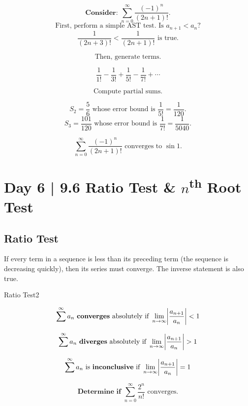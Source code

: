\documentclass[10pt]{article}
\theoremstyle{definition}
\DeclarePairedDelimiter{\abs}{\lvert}{\rvert}
\begin{document}
\vspace{0.5 cm}


\[ \textbf{Consider: } \sum_{n=0}^{\infty} \frac{(-1)^n}{(2n+1)!}.\] 
\[\text{First, perform a simple AST test. Is } a_{n+1}<a_n?\]
\[\frac{1}{(2n+3)!}<\frac{1}{(2n+1)!} \text{ is true.}\]

\[\text{Then, generate terms.}\]


\[\frac{1}{1!} - \frac{1}{3!} + \frac{1}{5!} - \frac{1}{7!} + \cdots\]

\[\text{Compute partial sums.}\]

\[S_2=\frac{5}{6} \text{ whose error bound is } \frac{1}{5!}=\frac{1}{120}.\]
\[S_3=\frac{101}{120} \text{ whose error bound is } \frac{1}{7!}=\frac{1}{5040}.\]

\vspace{1cm}

\[\sum_{n=0}^{\infty} \frac{(-1)^n}{(2n+1)!} \text{ converges to } \sin 1.\]



\section{Day 6 | 9.6 Ratio Test \& $n$\textsuperscript{th} Root Test}
\vspace{0.3cm}
\subsection{Ratio Test}
If every term in a sequence is less than its preceding term (the sequence is decreasing quickly), then its series must converge. The inverse statement is also true. 

\begin{theorem}{Ratio Test}{2}

\[\sum^{\infty} a_n \text{ \textbf{converges} absolutely if } \lim_{n \to \infty} \abs*{\frac{a_{n+1}}{a_n}} < 1\]

\[\sum^{\infty} a_n \text{ \textbf{diverges} absolutely  if } \lim_{n \to \infty} \abs*{ \frac{a_{n+1}}{a_n}} > 1\]

\[\sum^{\infty} a_n \text{ is \textbf{inconclusive} if } \lim_{n \to \infty} \abs*{\frac{a_{n+1}}{a_n}} = 1\]

\end{theorem}

\vspace{0.5 cm}

\[ \textbf{Determine if } \sum_{n=0}^{\infty} \frac{2^n}{n!} \text{ converges.}\]
\end{document}
